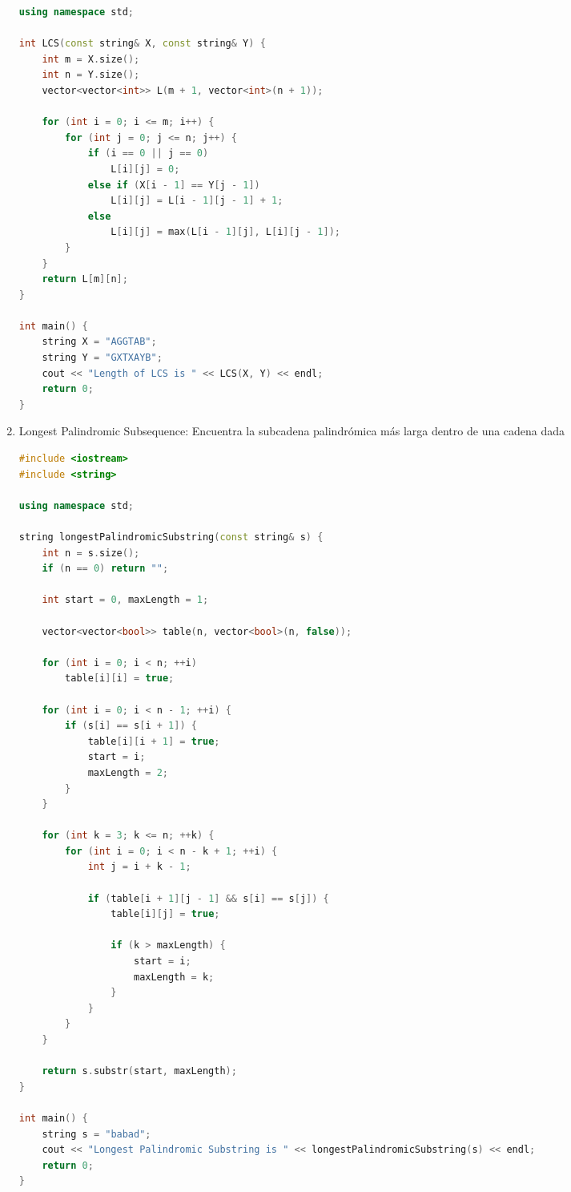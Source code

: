 \begin{enumerate}
\begin{lstlisting}[language=C++]
using namespace std;

int LCS(const string& X, const string& Y) {
    int m = X.size();
    int n = Y.size();
    vector<vector<int>> L(m + 1, vector<int>(n + 1));

    for (int i = 0; i <= m; i++) {
        for (int j = 0; j <= n; j++) {
            if (i == 0 || j == 0)
                L[i][j] = 0;
            else if (X[i - 1] == Y[j - 1])
                L[i][j] = L[i - 1][j - 1] + 1;
            else
                L[i][j] = max(L[i - 1][j], L[i][j - 1]);
        }
    }
    return L[m][n];
}

int main() {
    string X = "AGGTAB";
    string Y = "GXTXAYB";
    cout << "Length of LCS is " << LCS(X, Y) << endl;
    return 0;
}
	\end{lstlisting}
	\item Longest Palindromic Subsequence:
	Encuentra la subcadena palindrómica más larga dentro de una cadena dada
	\begin{lstlisting}[language=C++]
	#include <iostream>
#include <string>

using namespace std;

string longestPalindromicSubstring(const string& s) {
    int n = s.size();
    if (n == 0) return "";

    int start = 0, maxLength = 1;

    vector<vector<bool>> table(n, vector<bool>(n, false));

    for (int i = 0; i < n; ++i)
        table[i][i] = true;

    for (int i = 0; i < n - 1; ++i) {
        if (s[i] == s[i + 1]) {
            table[i][i + 1] = true;
            start = i;
            maxLength = 2;
        }
    }

    for (int k = 3; k <= n; ++k) {
        for (int i = 0; i < n - k + 1; ++i) {
            int j = i + k - 1;

            if (table[i + 1][j - 1] && s[i] == s[j]) {
                table[i][j] = true;

                if (k > maxLength) {
                    start = i;
                    maxLength = k;
                }
            }
        }
    }

    return s.substr(start, maxLength);
}

int main() {
    string s = "babad";
    cout << "Longest Palindromic Substring is " << longestPalindromicSubstring(s) << endl;
    return 0;
}
	\end{lstlisting}

\end{enumerate}
